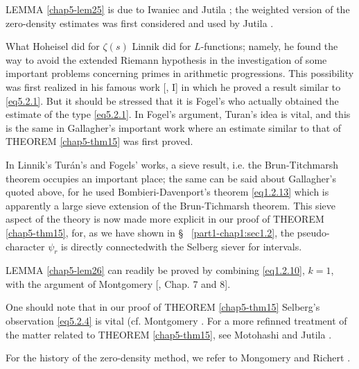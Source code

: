 LEMMA \ref{chap5-lem25} is due to Iwaniec and Jutila \cite{key34}; the
weighted version of 
the zero-density estimates was first considered and used by Jutila
\cite{key38}. 

What Hoheisel did for $\zeta (s)$ Linnik did for $L$-functions;
namely, he found the way to avoid the extended Riemann hypothesis in
the investigation of some important problems concerning primes in
arithmetic progressions. This possibility was first realized in  his
famous work [\cite{key47}, I] in which he proved a result similar to
\eqref{eq5.2.1}. But it should be stressed that it is Fogel's \cite{key12} who
actually obtained the estimate of the type \eqref{eq5.2.1}. In Fogel's argument,
Turan's idea \cite{key80} is vital, and this is the same in Gallagher's
important work \cite{key15} where an estimate similar to that of THEOREM
\ref{chap5-thm15} was first proved.

In Linnik's Tur\'an's and Fogels' works, a sieve result, i.e. the
Brun-Titchmarsh theorem occupies an important place; the same can be
said about Gallagher's quoted above, for he used Bombieri-Davenport's
theorem \eqref{eq1.2.13} which is apparently a large sieve extension of the
Brun-Tich\-marsh theorem. This sieve aspect of the theory is now made
more explicit in our proof of THEOREM \ref{chap5-thm15}, for, as we
have shown in \S~ \ref{part1-chap1:sec1.2}, the pseudo-character
$\psi_r$ is directly  
connected\pageoriginale with the Selberg siever for intervals.

LEMMA \ref{chap5-lem26} can readily be proved by combining \eqref{eq1.2.10},
$k=1$, with the 
argument of Montgomery [\cite{key48}, Chap. 7 and 8]. 

One should note that in our proof of THEOREM \ref{chap5-thm15} Selberg's
observation \eqref{eq5.2.4} is vital (cf. Montgomery \cite{key50}. For a more
refinned treatment of the matter related to THEOREM \ref{chap5-thm15},  see
Motohashi \cite{key53} and  Jutila \cite{key40}. 

For the history of the zero-density method, we refer   to Mongomery
\cite{key48} and Richert \cite{key66}. 
